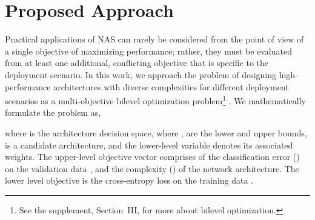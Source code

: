 \documentclass[journal]{IEEEtran}
\theoremstyle{definition}
\theoremstyle{remark}
\begin{document}
%
 \section{Proposed Approach\label{sec:approach}}
{Practical applications of NAS can rarely be considered from the point of view of a single objective of maximizing performance; rather, they must be evaluated from at least one additional, conflicting objective that is specific to the deployment scenario. In this work, we approach the problem of designing high-performance architectures with diverse complexities for different deployment scenarios as a multi-objective bilevel optimization problem}\footnote{See the supplement, Section~III, for more about bilevel optimization.} \cite{eichfelder2010multiobjective}. We mathematically formulate the problem as,
{


\noindent where  is the architecture decision space, where ,  are the lower and upper bounds,  is a candidate architecture, and the lower-level variable  denotes its associated weights. The upper-level objective vector  comprises of the classification error () on the validation data , and the complexity () of the network architecture. The lower level objective  is the cross-entropy loss on the training data .}
\end{document}
